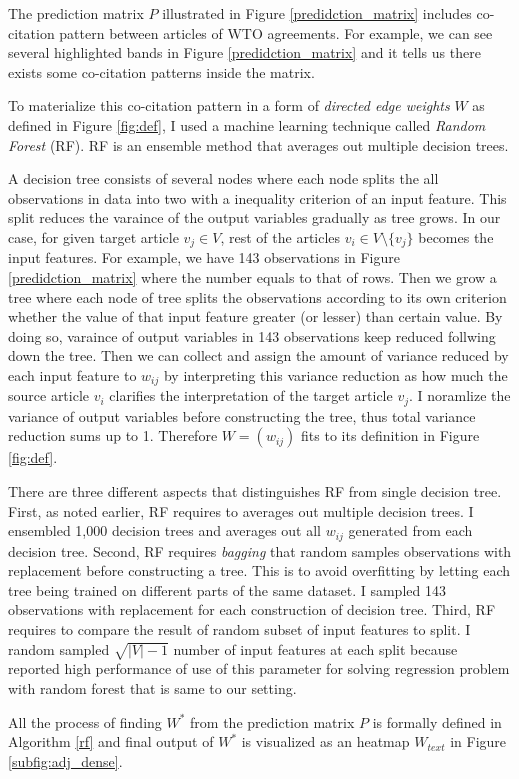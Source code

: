 The prediction matrix $P$ illustrated in Figure \ref{predidction_matrix}
includes co-citation pattern between articles of WTO agreements. For example,
we can see several highlighted bands in Figure \ref{predidction_matrix}
and it tells us there exists some co-citation patterns inside the matrix.

To materialize this co-citation pattern in a form of \textit{directed edge weights} $W$ as defined in Figure \ref{fig:def},
I used a machine learning technique called \textit{Random Forest} (RF). RF is an ensemble method that averages out
multiple decision trees.

A decision tree consists of several nodes where each node splits the all observations in data into two with a inequality criterion of an input feature.
This split reduces the varaince of the output variables gradually as tree grows.
In our case, for given target article $v_j \in V$, rest of the articles $v_i \in V \setminus \{v_j\}$ becomes the input features.
For example, we have 143 observations in Figure \ref{predidction_matrix} where the number equals to that of rows.
Then we grow a tree where each node of tree splits
the observations according to its own criterion
whether the value of that input feature greater (or lesser) than certain value.
By doing so,
varaince of output variables in 143 observations keep reduced follwing down the tree.
Then we can collect and assign the amount of variance reduced by each input feature to $w_{ij}$
by interpreting this variance reduction as how much
the source article $v_i$ clarifies the interpretation of the target article $v_j$.
I noramlize the variance of output variables before constructing the tree, thus total variance reduction
sums up to 1. Therefore $W = (w_{ij})$ fits to its definition in Figure \ref{fig:def}.

There are three different aspects that distinguishes RF from single decision tree.
First, as noted earlier, RF requires to averages out multiple decision trees.
I ensembled 1,000 decision trees and averages out all $w_{ij}$ generated from each decision tree.
Second, RF requires \textit{bagging} that random samples observations with replacement before constructing a tree.
This is to avoid overfitting by letting each tree being trained on different parts of the same dataset. 
I sampled 143 observations with replacement for each construction of decision tree. 
Third, RF requires to compare the result of random subset of input features to split.
I random sampled $\sqrt{|V|-1}$ number of input features at each split because \cite{genie3} reported high performance of use of this parameter for solving regression problem with random forest that is same to our setting.

All the process of finding $W^*$ from the prediction matrix $P$ is formally defined in Algorithm \ref{rf} and final output of $W^*$ is visualized as an heatmap $W_{text}$ in Figure \ref{subfig:adj_dense}.
